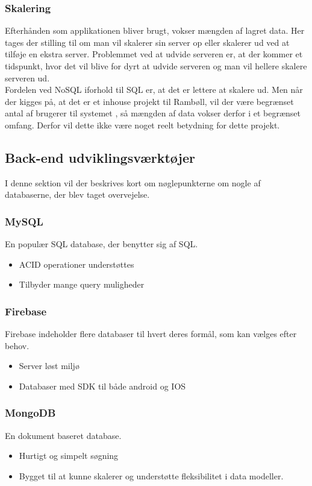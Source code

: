 \subsubsection{Skalering}
Efterhånden som applikationen bliver brugt, vokser mængden af lagret data. Her tages der stilling til om man vil skalerer sin server op eller skalerer ud ved at tilføje en ekstra server. Problemmet ved at udvide serveren er, at der kommer et tidspunkt, hvor det vil blive for dyrt at udvide serveren og man vil hellere skalere serveren ud. \\
Fordelen ved NoSQL iforhold til SQL er, at det er lettere at skalere ud. Men
når der kigges på, at det er et inhouse projekt til Rambøll, vil der være begrænset antal af brugerer til systemet , så mængden af data vokser derfor i et begrænset omfang. 
Derfor vil dette ikke være noget reelt betydning for dette projekt.

\subsection{Back-end udviklingsværktøjer}
I denne sektion vil der beskrives kort om nøglepunkterne om nogle af databaserne, der blev taget overvejelse. 

\subsubsection{MySQL\cite{MySQL}}
En populær SQL database, der benytter sig af SQL.
\begin{itemize}[-]
	\item ACID\cite{ACID} operationer understøttes
	\item Tilbyder mange query muligheder
\end{itemize}

\subsubsection{Firebase\cite{Firebase}}
Firebase indeholder flere databaser til hvert deres formål, som kan vælges efter behov. 
\begin{itemize}[-]
	\item Server løst miljø
	\item Databaser med SDK til både android og IOS
\end{itemize}

\subsubsection{MongoDB\cite{mongoDB}}
En dokument baseret database.
\begin{itemize}[-]
	\item Hurtigt og simpelt søgning
	\item Bygget til at kunne skalerer og understøtte fleksibilitet i data modeller.  \\
	
\end{itemize}

